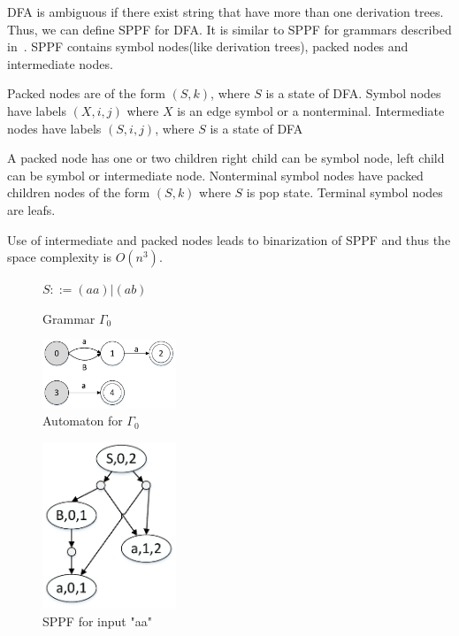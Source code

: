 \documentclass[runningheads,a4paper]{llncs}
\begin{document}
DFA is ambiguous if there exist string that have more than one derivation trees. Thus, we can define SPPF for DFA. 
It is similar to SPPF for grammars described in~\cite{scott2013gll}. SPPF contains symbol nodes(like derivation trees), packed nodes
and intermediate nodes. 

Packed nodes are of the form $(S, k)$, where $S$ is a state of DFA. 
Symbol nodes have labels $(X, i, j)$ where $X$ is an edge symbol or a nonterminal. 
Intermediate nodes have labels $ (S, i, j) $, where $S$ is a state of DFA

A packed node has one or two children right child can be symbol node, left child can be symbol or intermediate node.   
Nonterminal symbol nodes have packed children nodes of the form $(S, k)$ where $S$ is pop state. 
Terminal symbol nodes are leafs.

 Use of intermediate and packed nodes leads to binarization of SPPF and thus the space complexity is $O(n^{3})$.

\begin{figure}
    \centering
    \parbox{2.9cm}{
        \begin{center}
            $S ::= (aa)|(ab)$
        \end{center}
        \caption{Grammar $\Gamma_{0}$}
        \label{fig:grammarG0}}
    \qquad
    \begin{minipage}{4cm}
        \includegraphics[width=4cm]{pictures/automatonForG0.pdf}
        \caption{Automaton for $\Gamma_{0}$}
        \label{fig:automatonForG0}
    \end{minipage}
\end{figure}

\begin{figure}
    \centering
    \includegraphics[width=4cm]{pictures/SPPFforG0.pdf}
    \caption{SPPF for input "aa"}
    \label{fig:SPPF}
\end{figure}
\end{document}
